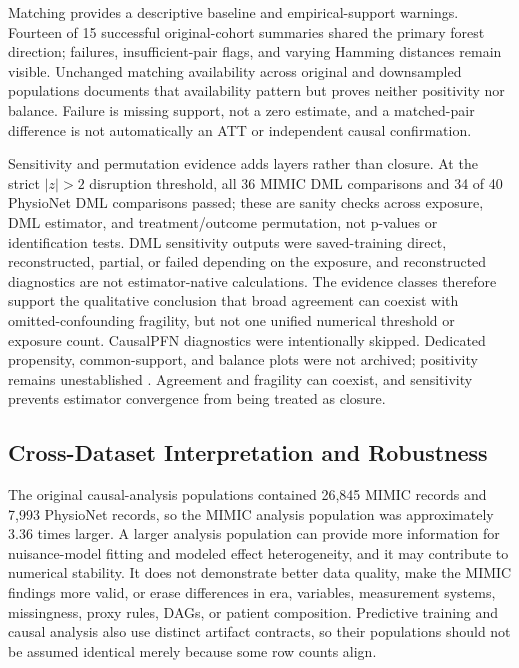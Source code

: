 Matching provides a descriptive baseline and empirical-support warnings.  Fourteen of 15 successful original-cohort summaries shared the primary forest direction; failures, insufficient-pair flags, and varying Hamming distances remain visible.  Unchanged matching availability across original and downsampled populations documents that availability pattern but proves neither positivity nor balance.  Failure is missing support, not a zero estimate, and a matched-pair difference is not automatically an ATT or independent causal confirmation.

Sensitivity and permutation evidence adds layers rather than closure.  At the strict $\lvert z\rvert>2$ disruption threshold, all 36 MIMIC DML comparisons and 34 of 40 PhysioNet DML comparisons passed; these are sanity checks across exposure, DML estimator, and treatment/outcome permutation, not p-values or identification tests.  DML sensitivity outputs were saved-training direct, reconstructed, partial, or failed depending on the exposure, and reconstructed diagnostics are not estimator-native calculations.  The evidence classes therefore support the qualitative conclusion that broad agreement can coexist with omitted-confounding fragility, but not one unified numerical threshold or exposure count.  CausalPFN diagnostics were intentionally skipped.  Dedicated propensity, common-support, and balance plots were not archived; positivity remains unestablished \cite{crump_et_al_2009_limited_overlap,cinelli_hazlett_2020_sensitivity,chernozhukov_et_al_2026_ovb_causal_ml}.  Agreement and fragility can coexist, and sensitivity prevents estimator convergence from being treated as closure.

\subsection{Cross-Dataset Interpretation and Robustness}
\label{subsec:discussion:cross-dataset-robustness}

The original causal-analysis populations contained 26,845 MIMIC records and 7,993 PhysioNet records, so the MIMIC analysis population was approximately 3.36 times larger.  A larger analysis population can provide more information for nuisance-model fitting and modeled effect heterogeneity, and it may contribute to numerical stability.  It does not demonstrate better data quality, make the MIMIC findings more valid, or erase differences in era, variables, measurement systems, missingness, proxy rules, DAGs, or patient composition.  Predictive training and causal analysis also use distinct artifact contracts, so their populations should not be assumed identical merely because some row counts align.

